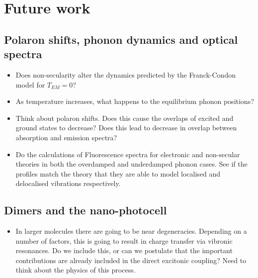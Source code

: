 \documentclass[]{article}
\begin{document}
\begin{comment}
\subsection{Validity of RWA}
\begin{itemize}
	\item Comparing \ref{ssec:nrwa} and \ref{ssec:nsec} find regimes where the two different Hamiltonians yield the same dynamics. Within these regimes, do they agree with the secular theories too? Therefore, does secular imply rotating-wave (at least in the dissipators)?
	\item It seems like the underdamped spectral density reduces the temperature dependence of the dynamics. For strong phonon coupling, non-secular is never equivalent to the secular theory.
\end{itemize}
\end{comment}
\section{Future work}

\subsection{Polaron shifts, phonon dynamics and optical spectra}

\begin{itemize}
	\item Does non-secularity alter the dynamics predicted by the Franck-Condon model for $T_{EM}=0$?
	\item As temperature increases, what happens to the equilibrium phonon positions?
	\item Think about polaron shifts. Does this cause the overlaps of excited and ground states to decrease? Does this lead to decrease in overlap between absorption and emission spectra?
	\item Do the calculations of Fluorescence spectra for electronic and non-secular theories in both the overdamped and underdamped phonon cases. See if the profiles match the theory that they are able to model localised and delocalised vibrations respectively.
\end{itemize}

\subsection{Dimers and the nano-photocell}
\begin{itemize}
	\item In larger molecules there are going to be near degeneracies. Depending on a number of factors, this is going to result in charge transfer via vibronic resonances. Do we include this, or can we postulate that the important contributions are already included in the direct excitonic coupling? Need to think about the physics of this process.
\end{itemize}


\end{document}
